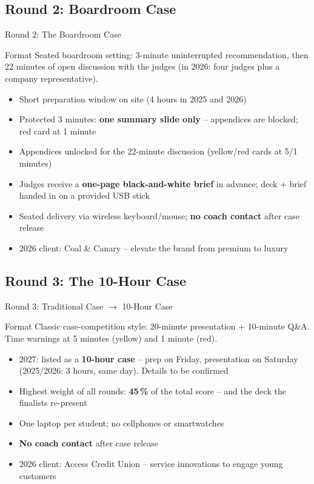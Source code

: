 \documentclass[aspectratio=169,11pt]{beamer}
\begin{document}
\subsection{Round 2: Boardroom Case}

\begin{frame}{Round 2: The Boardroom Case}
  \begin{block}{Format}
    Seated boardroom setting: 3-minute uninterrupted recommendation, then 22 minutes of open discussion with the judges (in 2026: four judges plus a company representative).
  \end{block}
  \begin{itemize}
    \item Short preparation window on site (4 hours in 2025 and 2026)
    \item Protected 3 minutes: \textbf{one summary slide only} -- appendices are blocked; red card at 1 minute
    \item Appendices unlocked for the 22-minute discussion (yellow/red cards at 5/1 minutes)
    \item Judges receive a \textbf{one-page black-and-white brief} in advance; deck + brief handed in on a provided USB stick
    \item Seated delivery via wireless keyboard/mouse; \textbf{no coach contact} after case release
    \item 2026 client: Coal \& Canary -- elevate the brand from premium to luxury
  \end{itemize}
\end{frame}

\subsection{Round 3: The 10-Hour Case}

\begin{frame}{Round 3: Traditional Case $\rightarrow$ 10-Hour Case}
  \begin{block}{Format}
    Classic case-competition style: 20-minute presentation + 10-minute Q\&A. Time warnings at 5 minutes (yellow) and 1 minute (red).
  \end{block}
  \begin{itemize}
    \item 2027: listed as a \textbf{10-hour case} -- prep on Friday, presentation on Saturday (2025/2026: 3 hours, same day). Details to be confirmed
    \item Highest weight of all rounds: \textbf{45\,\%} of the total score -- and the deck the finalists re-present
    \item One laptop per student; no cellphones or smartwatches
    \item \textbf{No coach contact} after case release
    \item 2026 client: Access Credit Union -- service innovations to engage young customers
  \end{itemize}
\end{frame}
\end{document}
